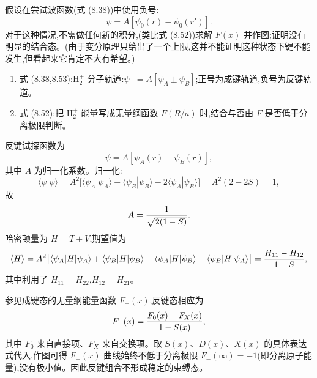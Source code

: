 \begin{question}
假设在尝试波函数(式 (8.38))中使用负号:
\[
\psi=A[\psi_0(r)-\psi_0(r')].
\]
对于这种情况,不需做任何新的积分,(类比式 (8.52))求解 $F(x)$ 并作图;证明没有明显的结合态。(由于变分原理只给出了一个上限,这并不能证明这种状态下键不能发生,但看起来它肯定不大有希望。)

\par\smallskip
{}
\begin{enumerate}[leftmargin=2.2em,itemsep=0.12em,topsep=0.12em,parsep=0pt]
\item 式 (8.38,8.53):$\mathrm H_2^+$ 分子轨道:$\psi_\pm=A[\psi_A\pm\psi_B]$;正号为成键轨道,负号为反键轨道。
\item 式 (8.52):把 $\mathrm H_2^+$ 能量写成无量纲函数 $F(R/a)$ 时,结合与否由 $F$ 是否低于分离极限判断。
\end{enumerate}

\end{question}
\begin{solution}
反键试探函数为
\[
\psi=A[\psi_A(r)-\psi_B(r)],
\]
其中 $A$ 为归一化系数。归一化:
\[
\langle\psi|\psi\rangle=A^2\bigl[\langle\psi_A|\psi_A\rangle+\langle\psi_B|\psi_B\rangle-2\langle\psi_A|\psi_B\rangle\bigr]
=A^2(2-2S)=1,
\]
故
\[
A={1\over\sqrt{2(1-S)}}.
\]
哈密顿量为 $H=T+V$,期望值为
\[
\langle H\rangle=
{A^2}\bigl[\langle\psi_A|H|\psi_A\rangle+\langle\psi_B|H|\psi_B\rangle
-\langle\psi_A|H|\psi_B\rangle-\langle\psi_B|H|\psi_A\rangle\bigr]
={H_{11}-H_{12}\over1-S},
\]
其中利用了 $H_{11}=H_{22}$,$H_{12}=H_{21}$。

参见成键态的无量纲能量函数 $F_+(x)$,反键态相应为
\[
F_-(x)={F_0(x)-F_X(x)\over1-S(x)},
\]
其中 $F_0$ 来自直接项、$F_X$ 来自交换项。取 $S(x)$、$D(x)$、$X(x)$ 的具体表达式代入,作图可得 $F_-(x)$ 曲线始终不低于分离极限 $F_-(\infty)=-1$(即分离原子能量),没有极小值。因此反键组合不形成稳定的束缚态。
\end{solution}

